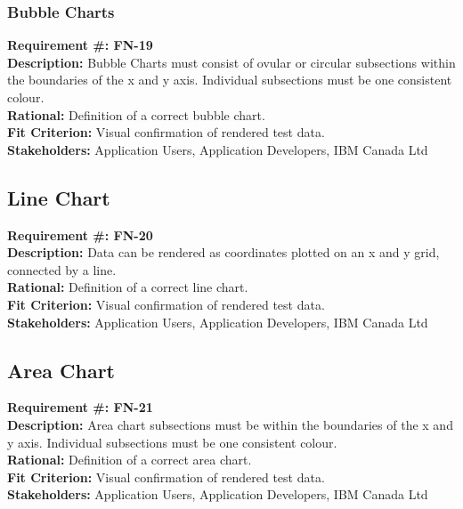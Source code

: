 \documentclass[12pt, titlepage]{article}
\begin{document}
\subsubsection{Bubble Charts}
\begin{flushleft}
\textbf{Requirement \#: FN-19} \\
\textbf{Description:} Bubble Charts must consist of ovular or circular subsections within the boundaries of the x and y axis. Individual subsections must be one consistent colour.  \\
\textbf{Rational:} Definition of a correct bubble chart. \\
\textbf{Fit Criterion:} Visual confirmation of rendered test data. \\
\textbf{Stakeholders:} Application Users, Application Developers, IBM Canada Ltd\\
\end{flushleft}

\subsection{Line Chart}
\begin{flushleft}
\textbf{Requirement \#: FN-20} \\
\textbf{Description:} Data can be rendered as coordinates plotted on an x and y grid, connected by a line. \\
\textbf{Rational:} Definition of a correct line chart. \\
\textbf{Fit Criterion:} Visual confirmation of rendered test data. \\
\textbf{Stakeholders:} Application Users, Application Developers, IBM Canada Ltd\\
\end{flushleft}

\subsection{Area Chart}
\begin{flushleft}
\textbf{Requirement \#: FN-21} \\
\textbf{Description:} Area chart subsections must be within the boundaries of the x and y axis. Individual subsections must be one consistent colour.  \\
\textbf{Rational:} Definition of a correct area chart. \\
\textbf{Fit Criterion:} Visual confirmation of rendered test data. \\
\textbf{Stakeholders:} Application Users, Application Developers, IBM Canada Ltd\\
\end{flushleft}
\end{document}
